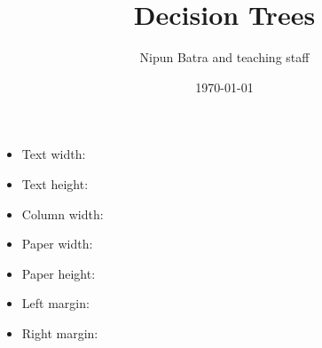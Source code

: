 \documentclass[usenames,dvipsnames]{beamer}
\title{Decision Trees}
\date{\today}
\author{Nipun Batra and teaching staff}
\institute{IIT Gandhinagar}
\begin{document}
	\maketitle

    \begin{frame}
        
        \begin{itemize}
\item Text width: \the\textwidth
            \item Text height: \the\textheight
            \pause
\item Column width: \the\columnwidth
            \item Paper width: \the\paperwidth
            \item Paper height: \the\paperheight
            \pause
\item Left margin: \the\oddsidemargin
            \item Right margin: \the\evensidemargin
        
          \end{itemize}

\end{frame}
\end{document}

